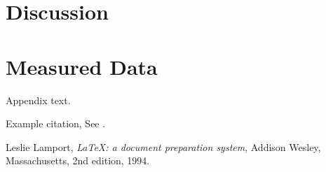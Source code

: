 \documentclass[preprint,12pt,authoryear]{elsarticle}
\begin{document}
\section{Discussion}
\label{sec4}

\appendix
\section{Measured Data}
\label{app1}

Appendix text.

Example citation, See \citet{lamport94}.




\begin{thebibliography}{00}


  Leslie Lamport,
  \textit{\LaTeX: a document preparation system},
  Addison Wesley, Massachusetts,
  2nd edition,
  1994.

\end{thebibliography}
\end{document}
